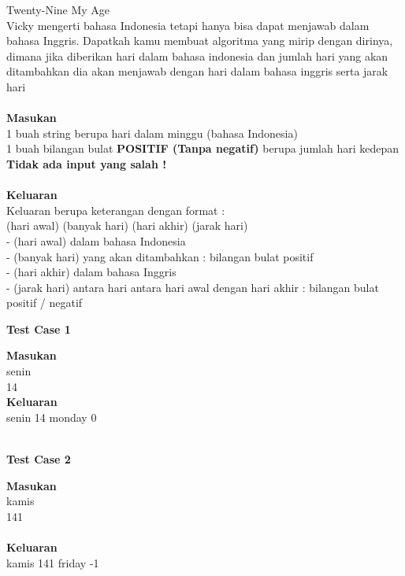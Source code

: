 \newpage
\begin{permasalahan}{Twenty-Nine My Age}\\
\label{prob:a29myage}
Vicky mengerti bahasa Indonesia tetapi hanya bisa dapat menjawab dalam bahasa Inggris. Dapatkah kamu membuat algoritma yang mirip dengan dirinya, dimana jika diberikan hari dalam bahasa indonesia dan jumlah hari yang akan ditambahkan dia akan menjawab dengan hari dalam bahasa inggris serta jarak hari\\\\
 
	\textbf{Masukan}\\
	1 buah string berupa hari dalam minggu (bahasa Indonesia)\\
	1 buah bilangan bulat \textbf{POSITIF (Tanpa negatif)} berupa jumlah hari kedepan \\
	\textbf{Tidak ada input yang salah !}\\\\
	\textbf{Keluaran}\\
	Keluaran berupa keterangan dengan format :\\
	(hari awal) (banyak hari) (hari akhir) (jarak hari)\\
	- (hari awal) dalam bahasa Indonesia\\
	- (banyak hari) yang akan ditambahkan : bilangan bulat positif\\
	- (hari akhir) dalam bahasa Inggris \\
	- (jarak hari) antara hari antara hari awal dengan hari akhir : bilangan bulat positif / negatif \\

	\begin{center}
	\textbf{Test Case 1}\\
	\end{center}
	\textbf{Masukan}\\
	senin \\
	14 \\
	\textbf{Keluaran}\\
	senin 14 monday 0\\\\
	
	\begin{center}
	\textbf{Test Case 2}\\
	\end{center}
	\textbf{Masukan}\\
	kamis \\
	141 \\\\
	\textbf{Keluaran}\\
	kamis 141 friday -1 \\\\



\end{permasalahan}
